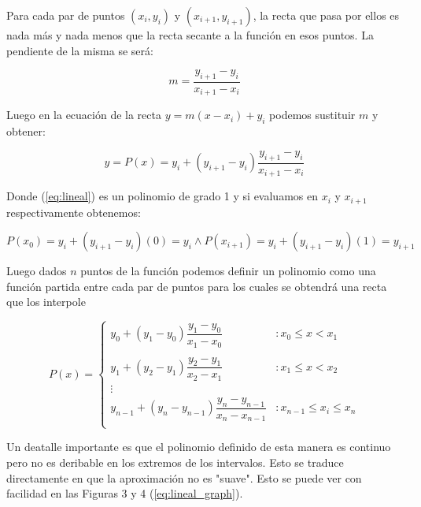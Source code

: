 \vspace{4mm}
Para cada par de puntos $(x_i, y_i)$ y $(x_{i+1}, y_{i+1})$, la recta que pasa por ellos es nada más y nada menos que la recta secante a la función en esos puntos. La pendiente de la misma se será:

\begin{equation}
	 m = \dfrac{y_{i+1} - y_i}{x_{i+1} - x_i}
\end{equation}

Luego en la ecuación de la recta $y = m(x - x_i) + y_i$ podemos sustituir $m$ y 
obtener:

\begin{equation} \label{eq:lineal}
	 y = P(x) = y_i + (y_{i+1} - y_i)\dfrac{y_{i+1} - y_i}{x_{i+1} - x_i} 
\end{equation} 

Donde (\ref{eq:lineal}) es un polinomio de grado 1 y si evaluamos en $x_i$ y $x_{i+1}$ respectivamente obtenemos:

\begin{equation}
	 P(x_0) = y_i + (y_{i+1} - y_i)(0) = y_i \wedge P(x_{i+1}) = y_i + (y_{i+1} - y_i)(1) = y_{i+1} 
\end{equation}

Luego dados $n$ puntos de la función podemos definir un polinomio como una función partida entre cada par de puntos para los cuales se obtendrá una recta que los interpole

 \begin{displaymath}
   P(x) = \left\{
     \begin{array}{lr}
       y_0 + (y_1 - y_0)\dfrac{y_1 - y_0}{x_1 - x_0}  & : x_0 \leq x < x_1\\\\
       y_1 + (y_2 - y_1)\dfrac{y_2 - y_1}{x_2 - x_1}  & : x_1 \leq x < x_2\\
       \vdots\\
       y_{n-1} + (y_n - y_{n-1})\dfrac{y_n - y_{n-1}}{x_n - x_{n-1}}  & : x_{n-1}	\leq x_i \leq x_n\\
     \end{array}
   \right.
\end{displaymath} 

Un deatalle importante es que el polinomio definido de esta manera es continuo pero no es deribable en los extremos de los intervalos. Esto se traduce directamente en que la aproximación no es "suave". Esto se puede ver con facilidad en las Figuras 3 y 4 (\ref{eq:lineal_graph}).

